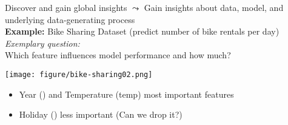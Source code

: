 \documentclass[10pt,compress,t,notes=noshow, xcolor=table]{beamer}
\begin{document}



\begin{frame}{Discover and gain global insights}
$\leadsto$ Gain insights about data, model, and underlying data-generating process \\
\medskip
\textbf{Example:} Bike Sharing Dataset (predict number of bike rentals per day) \\
\textit{Exemplary question:} \\Which feature influences model performance and how much?
\begin{center}
\texttt{[image: figure/bike-sharing02.png]}
\end{center}


\begin{itemize}
    \item Year () and Temperature (temp) most important features
    \item Holiday () less important (Can we drop it?)
\end{itemize}

\end{frame}


\end{document}
